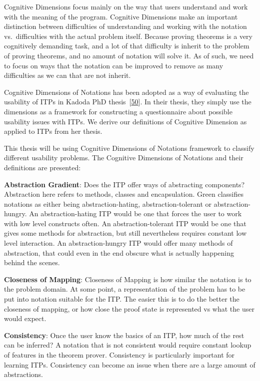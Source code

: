 \documentclass[
]{article}
\begin{document}
Cognitive Dimensions focus mainly on the way that users understand and
work with the meaning of the program. Cognitive Dimensions make an
important distinction between difficulties of understanding and working
with the notation vs.~difficulties with the actual problem itself.
Because proving theorems is a very cognitively demanding task, and a lot
of that difficulty is inherit to the problem of proving theorems, and no
amount of notation will solve it. As of such, we need to focus on ways
that the notation can be improved to remove as many difficulties as we
can that are not inherit.

Cognitive Dimensions of Notations has been adopted as a way of
evaluating the usability of ITPs in Kadoda PhD
thesis~{[}\protect\hyperlink{ref-kadoda_desirable_1999}{50}{]}. In their
thesis, they simply use the dimensions as a framework for constructing a
questionnaire about possible usability issues with ITPs. We derive our
definitions of Cognitive Dimension as applied to ITPs from her thesis.

This thesis will be using Cognitive Dimensions of Notations framework to
classify different usability problems. The Cognitive Dimensions of
Notations and their definitions are presented:

\textbf{Abstraction Gradient}: Does the ITP offer ways of abstracting
components? Abstraction here refers to methods, classes and
encapsulation. Green classifies notations as either being
abstraction-hating, abstraction-tolerant or abstraction-hungry. An
abstraction-hating ITP would be one that forces the user to work with
low level constructs often. An abstraction-tolerant ITP would be one
that gives some methods for abstraction, but still nevertheless requires
constant low level interaction. An abstraction-hungry ITP would offer
many methods of abstraction, that could even in the end obscure what is
actually happening behind the scenes.

\textbf{Closeness of Mapping}: Closeness of Mapping is how similar the
notation is to the problem domain. At some point, a representation of
the problem has to be put into notation suitable for the ITP. The easier
this is to do the better the closeness of mapping, or how close the
proof state is represented vs what the user would expect.

\textbf{Consistency}: Once the user know the basics of an ITP, how much
of the rest can be inferred? A notation that is not consistent would
require constant lookup of features in the theorem prover. Consistency
is particularly important for learning ITPs. Consistency can become an
issue when there are a large amount of abstractions.
\end{document}

